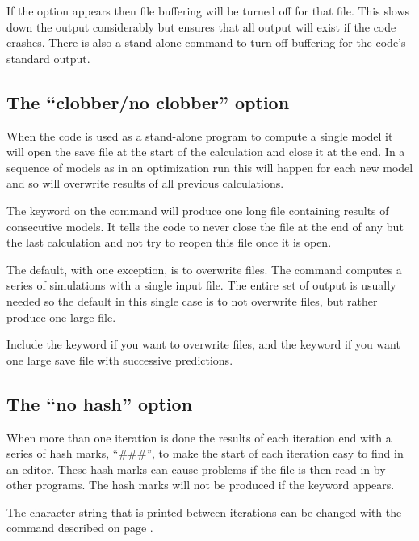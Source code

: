 If the option  appears then
file buffering will be turned
off for that file.
This slows down the output considerably but ensures
that all output will exist if the code crashes.
There is also a stand-alone
 command to turn off buffering
for the code's standard output.

\subsection{The ``clobber/no clobber'' option}

When the code is used as a stand-alone program to compute a
single model
it will open the save file at the start of the calculation and close it
at the end.
In a sequence of models as in an optimization run this will
happen for each new model and so will overwrite results of all previous
calculations.

The  keyword on the  command
will produce one long file
containing results of consecutive models.
It tells the code to never close
the file at the end of any but the last calculation and not try to reopen
this file once it is open.

The default, with one exception, is to overwrite files.
The
 command computes a series of simulations with a single
input file.
The entire set of output is usually needed so the default
in this single case is to not overwrite files,
but rather produce one large file.

Include the  keyword if you want to overwrite files,
and the  keyword if you want one
large save file with successive predictions.

\subsection{The ``no hash'' option}
\label{sec:SaveNoHashOption}
When more than one iteration is done the results of each iteration end
with a series of hash marks, ``\#\#\#'', to make the start of each iteration easy to find in an editor.
These hash marks can cause problems if the
file is then read in by other programs.
The hash marks will not be produced
if the  keyword appears.

The character string that is printed between iterations can be changed
with the  command
described on page \pageref{sec:CommandSetSaveHash}.


